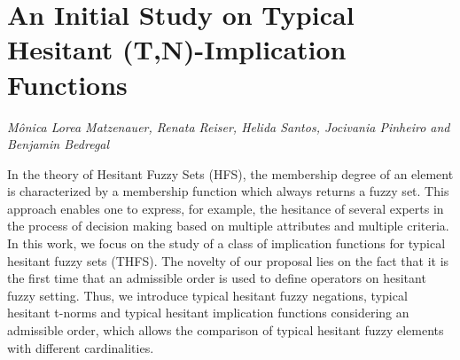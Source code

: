 \documentclass[../booklet.tex]{subfiles}
\begin{document}
\section[An Initial Study on Typical Hesitant (T,N)-Implication Functions. {\it Mônica Lorea Matzenauer, Renata Reiser, Helida Santos, Jocivania Pinheiro and Benjamin Bedregal}]{An Initial Study on Typical Hesitant (T,N)-Implication Functions}
    

\begin{center}
  {\it Mônica Lorea Matzenauer, Renata Reiser, Helida Santos, Jocivania Pinheiro and Benjamin Bedregal}
\end{center}

\vskip 0.8cm


In the theory of Hesitant Fuzzy Sets (HFS), the membership degree of an element is characterized by a membership function which always returns a fuzzy set. This approach enables one to express, for example, the hesitance of several experts in the process of decision making based on multiple attributes and multiple criteria. In this work, we focus on the study of a class of implication functions for typical hesitant fuzzy sets (THFS). The novelty of our proposal lies on the fact that it is the first time that an admissible order is used to define operators on hesitant fuzzy setting. Thus, we introduce  typical hesitant fuzzy negations, typical hesitant t-norms and  typical hesitant implication functions considering an admissible order, which allows the comparison of typical hesitant fuzzy elements with different cardinalities.


\end{document}
